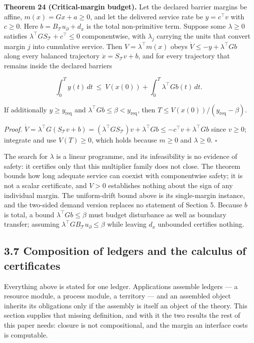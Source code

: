 \documentclass[11pt]{article}
\begin{document}
\textbf{Theorem 24 (Critical-margin budget).} Let the declared barrier margins be affine, \(m(x)=Gx+a\ge0\), and let the delivered service rate be \(y=c^{\top}v\) with \(c\ge0\). Here \(b=B_{\mathcal{T}}u_\partial+d_x\) is the total non-primitive term. Suppose some \(\lambda\ge0\) satisfies \(\lambda^{\top}GS_{\mathcal{T}}+c^{\top}\le0\) componentwise, with \(\lambda_j\) carrying the units that convert margin \(j\) into cumulative service. Then \(V=\lambda^{\top}m(x)\) obeys \(\dot V\le-y+\lambda^{\top}Gb\) along every balanced trajectory \(\dot x=S_{\mathcal{T}}v+b\), and for every trajectory that remains inside the declared barriers 

$$\int_0^Ty(t)\,dt\ \le\ V(x(0))+\int_0^T\lambda^{\top}Gb(t)\,dt .$$

 If additionally \(y\ge y_{\mathrm{req}}\) and \(\lambda^{\top}Gb\le\beta<y_{\mathrm{req}}\), then \(T\le V(x(0))/(y_{\mathrm{req}}-\beta)\).

\emph{Proof.} \(\dot V=\lambda^{\top}G(S_{\mathcal{T}}v+b)=(\lambda^{\top}GS_{\mathcal{T}})v+\lambda^{\top}Gb\le -c^{\top}v+\lambda^{\top}Gb\) since \(v\ge0\); integrate and use \(V(T)\ge0\), which holds because \(m\ge0\) and \(\lambda\ge0\). \(\square\)

The search for \(\lambda\) is a linear programme, and its infeasibility is no evidence of safety: it certifies only that this multiplier family does not close. The theorem bounds how long adequate service can coexist with componentwise safety; it is not a scalar certificate, and \(V>0\) establishes nothing about the sign of any individual margin. The uniform-drift bound above is its single-margin instance, and the two-sided demand version replaces no statement of Section 5. Because \(b\) is total, a bound \(\lambda^\top Gb\le\beta\) must budget disturbance as well as boundary transfer; assuming \(\lambda^\top GB_{\mathcal{T}}u_\partial\le\beta\) while leaving \(d_x\) unbounded certifies nothing.

\vspace{0.8em}

\subsection*{3.7 Composition of ledgers and the calculus of certificates}\label{37-composition-of-ledgers-and-the-calculus-of-certificates}

Everything above is stated for one ledger. Applications assemble ledgers --- a resource module, a process module, a territory --- and an assembled object inherits its obligations only if the assembly is itself an object of the theory. This section supplies that missing definition, and with it the two results the rest of this paper needs: closure is not compositional, and the margin an interface costs is computable.
\end{document}
